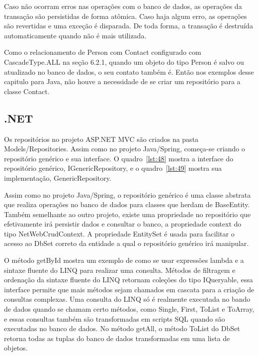 \documentclass[a4paper,12pt]{article}
\newcommand{\sharpcode}[3] {
	
}
\begin{document}
Caso não ocorram erros nas operações com o banco de dados, as operações da transação são persistidas de forma atômica. Caso haja algum erro, as operações são revertidas e uma exceção é disparada. De toda forma, a transação é destruída automaticamente quando não é mais utilizada.

Como o relacionamento de Person com Contact configurado com CascadeType.ALL na seção 6.2.1, quando um objeto do tipo Person é salvo ou atualizado no banco de dados, o seu contato também é. Então nos exemplos desse capitulo para Java, não houve a necessidade de se criar um repositório para a classe Contact.

\subsection{.NET}

Os repositórios no projeto ASP.NET MVC são criados na pasta Models/Repositories. Assim como no projeto Java/Spring, começa-se criando o repositório genérico e sua interface. O quadro~\ref{lst:48} mostra a interface do repositório genérico, IGenericRepository, e o quadro~\ref{lst:49} mostra sua implementação, GenericRepository.

\sharpcode{code/48.txt}{Interface IGenericRepository}{lst:48}

\sharpcode{code/49.txt}{Classe GenericRepository}{lst:49}

Assim como no projeto Java/Spring, o repositório genérico é uma classe abstrata que realiza operações no banco de dados para classes que herdam de BaseEntity. Também semelhante ao outro projeto, existe uma propriedade no repositório que efetivamente irá persistir dados e consultar o banco, a propriedade context do tipo NetWebCrudContext. A propriedade EntitySet é usada para facilitar o acesso ao DbSet correto da entidade a qual o repositório genérico irá manipular.

O método getById mostra um exemplo de como se usar expressões lambda e a sintaxe fluente do LINQ para realizar uma consulta. Métodos de filtragem e ordenação da sintaxe fluente do LINQ retornam coleções do tipo IQueryable, essa interface permite que mais métodos sejam chamados em cascata para a criação de consultas complexas. Uma consulta do LINQ só é realmente executada no bando de dados quando se chamam certo métodos, como Single, First, ToList e ToArray, e essas consultas também são transformadas em scripts SQL quando são executadas no banco de dados. No método getAll, o método ToList do DbSet retorna todas as tuplas do banco de dados transformadas em uma lista de objetos.
\end{document}
